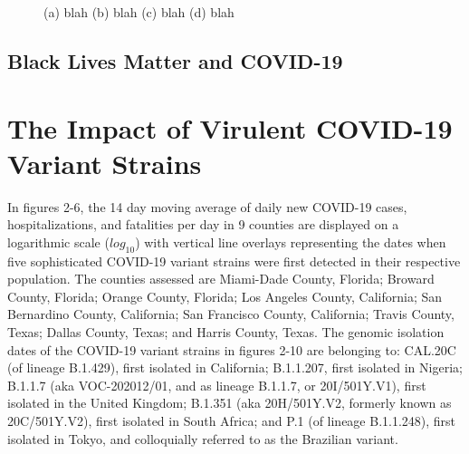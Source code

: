 \documentclass[]{article}
\begin{document}
\begin{figure}
	\caption{(a) blah (b) blah (c) blah (d) blah}
	\label{fig:foobar}
\end{figure}
\FloatBarrier
\vspace{5mm}


\subsection{Black Lives Matter and COVID-19}

\vspace{5mm}
\section{The Impact of Virulent COVID-19 Variant Strains}

\indent In figures 2-6, the 14 day moving average of daily new COVID-19 cases, hospitalizations, and fatalities per day in 9 counties are displayed on a logarithmic scale ($log_{10}$) with vertical line overlays representing the dates when five sophisticated COVID-19 variant strains were first detected in their respective population. The counties assessed are Miami-Dade County, Florida; Broward County, Florida; Orange County, Florida; Los Angeles County, California; San Bernardino County, California; San Francisco County, California; Travis County, Texas; Dallas County, Texas; and Harris County, Texas. The genomic isolation dates of the COVID-19 variant strains in figures 2-10 are belonging to: CAL.20C (of lineage B.1.429), first isolated in California; B.1.1.207, first isolated in Nigeria; B.1.1.7 (aka VOC-202012/01, and as lineage B.1.1.7, or 20I/501Y.V1), first isolated in the United Kingdom; B.1.351 (aka 20H/501Y.V2, formerly known as 20C/501Y.V2), first isolated in South Africa; and P.1 (of lineage B.1.1.248), first isolated in Tokyo, and colloquially referred to as the Brazilian variant. 
\end{document}
